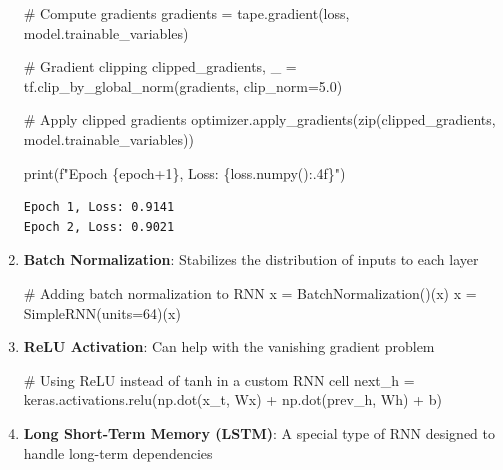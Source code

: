 \documentclass[
  letterpaper,
  DIV=11,
  numbers=noendperiod]{scrreprt}
\newenvironment{Shaded}{\begin{snugshade}}{\end{snugshade}}
\newcommand{\BuiltInTok}[1]{\textcolor[rgb]{0.00,0.23,0.31}{#1}}
\newcommand{\CommentTok}[1]{\textcolor[rgb]{0.37,0.37,0.37}{#1}}
\newcommand{\DecValTok}[1]{\textcolor[rgb]{0.68,0.00,0.00}{#1}}
\newcommand{\FloatTok}[1]{\textcolor[rgb]{0.68,0.00,0.00}{#1}}
\newcommand{\NormalTok}[1]{\textcolor[rgb]{0.00,0.23,0.31}{#1}}
\newcommand{\OperatorTok}[1]{\textcolor[rgb]{0.37,0.37,0.37}{#1}}
\newcommand{\SpecialCharTok}[1]{\textcolor[rgb]{0.37,0.37,0.37}{#1}}
\newcommand{\SpecialStringTok}[1]{\textcolor[rgb]{0.13,0.47,0.30}{#1}}
\begin{document}
\begin{enumerate}
\begin{Shaded}
\begin{Highlighting}[]
         \CommentTok{\# Compute gradients}
\NormalTok{         gradients }\OperatorTok{=}\NormalTok{ tape.gradient(loss, model.trainable\_variables)}

         \CommentTok{\# Gradient clipping}
\NormalTok{         clipped\_gradients, \_ }\OperatorTok{=}\NormalTok{ tf.clip\_by\_global\_norm(gradients, clip\_norm}\OperatorTok{=}\FloatTok{5.0}\NormalTok{)}

         \CommentTok{\# Apply clipped gradients}
\NormalTok{         optimizer.apply\_gradients(}\BuiltInTok{zip}\NormalTok{(clipped\_gradients, model.trainable\_variables))}

     \BuiltInTok{print}\NormalTok{(}\SpecialStringTok{f"Epoch }\SpecialCharTok{\{}\NormalTok{epoch}\OperatorTok{+}\DecValTok{1}\SpecialCharTok{\}}\SpecialStringTok{, Loss: }\SpecialCharTok{\{}\NormalTok{loss}\SpecialCharTok{.}\NormalTok{numpy()}\SpecialCharTok{:.4f\}}\SpecialStringTok{"}\NormalTok{)}
\end{Highlighting}
\end{Shaded}

\begin{verbatim}
Epoch 1, Loss: 0.9141
Epoch 2, Loss: 0.9021
\end{verbatim}
\item
  \textbf{Batch Normalization}: Stabilizes the distribution of inputs to
  each layer

\begin{Shaded}
\begin{Highlighting}[]
\CommentTok{\# Adding batch normalization to RNN}
\NormalTok{x }\OperatorTok{=}\NormalTok{ BatchNormalization()(x)}
\NormalTok{x }\OperatorTok{=}\NormalTok{ SimpleRNN(units}\OperatorTok{=}\DecValTok{64}\NormalTok{)(x)}
\end{Highlighting}
\end{Shaded}
\item
  \textbf{ReLU Activation}: Can help with the vanishing gradient problem

\begin{Shaded}
\begin{Highlighting}[]
\CommentTok{\# Using ReLU instead of tanh in a custom RNN cell}
\NormalTok{next\_h }\OperatorTok{=}\NormalTok{ keras.activations.relu(np.dot(x\_t, Wx) }\OperatorTok{+}\NormalTok{ np.dot(prev\_h, Wh) }\OperatorTok{+}\NormalTok{ b)}
\end{Highlighting}
\end{Shaded}
\item
  \textbf{Long Short-Term Memory (LSTM)}: A special type of RNN designed
  to handle long-term dependencies
\end{enumerate}
\end{document}
